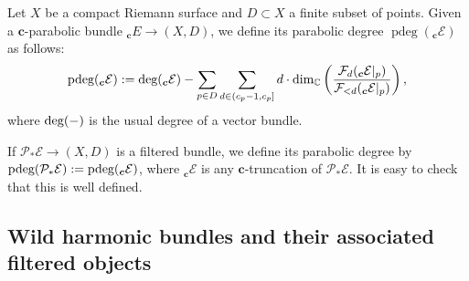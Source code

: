 \begin{Definition} Let $X$ be a compact Riemann surface and $D\subset X$ a finite subset of points. Given a $\boldsymbol{c}$-parabolic bundle $_{\boldsymbol{c}}E\to (X,D)$, we define its parabolic degree $\operatorname{pdeg}(_{\boldsymbol{c}}\mathcal{E})$ as follows:
\begin{equation*}
 \textnormal{pdeg}(_{\boldsymbol{c}}\mathcal{E}):= \textnormal{deg}(_{\boldsymbol{c}}\mathcal{E}) - \sum_{p\in D}\sum_{d\in (c_p-1,c_p]} d\cdot \textnormal{dim}_{\mathbb{C}}\left(\frac{\mathcal{F}_d(_{\boldsymbol{c}}\mathcal{E}|_p)}{{\mathcal{F}_{<d}(_{\boldsymbol{c}}\mathcal{E}|_p)}}\right),
\end{equation*}
where $\textnormal{deg}(-)$ is the usual degree of a vector bundle.

If $\mathcal{P}_*\mathcal{E} \to (X,D)$ is a filtered bundle, we define its parabolic degree by
$
 \textnormal{pdeg}(\mathcal{P}_*\mathcal{E}):=\textnormal{pdeg}(_{\boldsymbol{c}}\mathcal{E})$,
where $_{\boldsymbol{c}}\mathcal{E}$ is any $\boldsymbol{c}$-truncation of $\mathcal{P}_*\mathcal{E}$. It is easy to check that this is well defined.

\end{Definition}

\subsection{Wild harmonic bundles and their associated filtered objects}\label{WHB}

